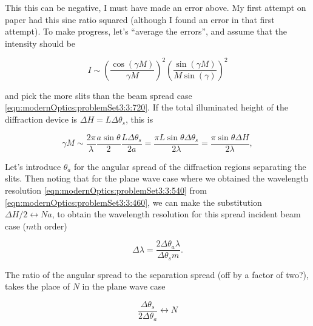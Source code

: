 {This this can be negative, I must have made an error above.  My first attempt on paper had this sine ratio squared (although I found an error in that first attempt).  To make progress, let's ``average the errors'', and assume that the intensity should be

\begin{dmath}\label{eqn:modernOptics:problemSet3:3:920}
I \sim \left( \frac{\cos( \gamma M )}{\gamma M} \right)^2
\left( \frac{\sin(\gamma M) }{ M \sin( \gamma)} \right)^2
\end{dmath}

and pick the more slits than the beam spread case \ref{eqn:modernOptics:problemSet3:3:720}.  If the total illuminated height of the diffraction device is $\Delta H = L \Delta \theta_s$, this is

\begin{dmath}\label{eqn:modernOptics:problemSet3:3:940}
\gamma M \sim
\frac{2 \pi}{\lambda} \frac{a \sin\theta}{2} \frac{L \Delta \theta_s}{2 a} 
=
\frac{\pi L \sin\theta \Delta \theta_s}{2 \lambda} 
=
\frac{\pi \sin\theta \Delta H}{2 \lambda},
\end{dmath}

Let's introduce $\theta_a$ for the angular spread of the diffraction regions separating the slits.  Then noting that for the plane wave case where we obtained the wavelength resolution \ref{eqn:modernOptics:problemSet3:3:540} from \ref{eqn:modernOptics:problemSet3:3:460}, we can make the substitution $\Delta H/2 \leftrightarrow N a$, to obtain the wavelength resolution for this spread incident beam case ($m$th order)

\begin{dmath}\label{eqn:modernOptics:problemSet3:3:960}
\Delta \lambda = \frac{2 \Delta \theta_a \lambda}{\Delta \theta_s m}.
\end{dmath}

The ratio of the angular spread to the separation spread (off by a factor of two?), takes the place of $N$ in the plane wave case

\begin{dmath}\label{eqn:modernOptics:problemSet3:3:n}
\frac{\Delta \theta_s }{2 \Delta \theta_a} \leftrightarrow N
\end{dmath}


} %

